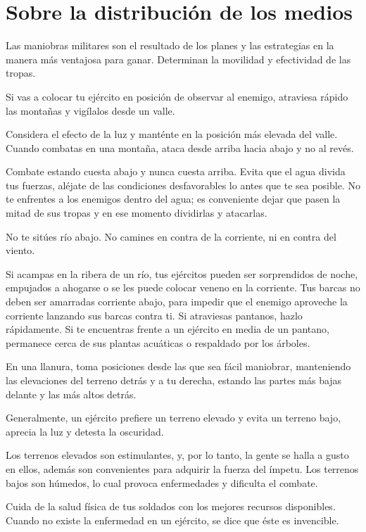 \chapter{Sobre la distribución de los medios}

Las maniobras militares son el resultado de los planes y las estrategias en la manera más ventajosa para ganar. Determinan la movilidad y efectividad de las tropas.

Si vas a colocar tu ejército en posición de observar al enemigo, atraviesa rápido las montañas y vigílalos desde un valle.

Considera el efecto de la luz y manténte en la posición más elevada del valle. Cuando combatas en una montaña, ataca desde arriba hacia abajo y no al revés.

Combate estando cuesta abajo y nunca cuesta arriba. Evita que el agua divida tus fuerzas, aléjate de las condiciones desfavorables lo antes que te sea posible. No te enfrentes a los enemigos dentro del agua; es conveniente dejar que pasen la mitad de sus tropas y en ese momento dividirlas y atacarlas.

No te sitúes río abajo. No camines en contra de la corriente, ni en contra del viento.

Si acampas en la ribera de un río, tus ejércitos pueden ser sorprendidos de noche, empujados a ahogarse o se les puede colocar veneno en la corriente. Tus barcas no deben ser amarradas corriente abajo, para impedir que el enemigo aproveche la corriente lanzando sus barcas contra ti. Si atraviesas pantanos, hazlo rápidamente. Si te encuentras frente a un ejército en media de un pantano, permanece cerca de sus plantas acuáticas o respaldado por los árboles.

En una llanura, toma posiciones desde las que sea fácil maniobrar, manteniendo las elevaciones del terreno detrás y a tu derecha, estando las partes más bajas delante y las más altos detrás.

Generalmente, un ejército prefiere un terreno elevado y evita un terreno bajo, aprecia la luz y detesta la oscuridad.

Los terrenos elevados son estimulantes, y, por lo tanto, la gente se halla a gusto en ellos, además son convenientes para adquirir la fuerza del ímpetu. Los terrenos bajos son húmedos, lo cual provoca enfermedades y dificulta el combate.

Cuida de la salud física de tus soldados con los mejores recursos disponibles. Cuando no existe la enfermedad en un ejército, se dice que éste es invencible.

